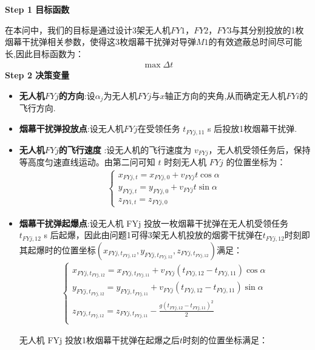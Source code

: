 \documentclass[../main.tex]{subfiles}
\begin{document}
\noindent \textbf{Step 1 目标函数}
\par 在本问中，我们的目标是通过设计3架无人机$FY1$，$FY2$，$FY3$与其分别投放的1枚烟幕干扰弹相关参数，使得这3枚烟幕干扰弹对导弹$M1$的有效遮蔽总时间尽可能长,因此目标函数为：
\begin{align}\label{19.1}
  \max \Delta t
\end{align}
\noindent \textbf{Step 2 决策变量}

\begin{itemize}
\item \textbf{无人机$FYj$的方向}:设$\alpha_j$为无人机$FYj$与$x$轴正方向的夹角,从而确定无人机$FYi$的飞行方向.
\item \textbf{烟幕干扰弹投放点}:设无人机$FYj$在受领任务 \( t_{FYj,11} \) s 后投放1枚烟幕干扰弹.
\item  \textbf{无人机$FYj$的飞行速度} :设无人机的飞行速度为 \( v_{FYj} \)，无人机受领任务后，保持等高度匀速直线运动。由第二问可知 \( t \) 时刻无人机 \( FYj \) 的位置坐标为：
\begin{align}\label{19.3}
  \begin{cases}
x_{FYj,t} = x_{FYj,0} + v_{FYj} t \cos\alpha \\
y_{FYj,t} = y_{FYj,0} + v_{FYj} t \sin\alpha \\
z_{FYi,t} = z_{FYj,0}
\end{cases}
\end{align}
\item \textbf{烟幕干扰弹起爆点}:设无人机 FYj 投放一枚烟幕干扰弹在无人机受领任务 \( t_{FYj,12} \) s 后起爆，因此由问题1可得3架无人机投放的烟雾干扰弹在$t_{FYj,12}$时刻即其起爆时的位置坐标$\left( x_{FYj,t_{FYj,12}},y_{FYj,t_{FYj,12}},z_{FYj,t_{FYj,12}} \right)$满足：
\begin{align}\label{19.4}
\left\{ \begin{array}{l}
	x_{FYj,t_{FYj,12}}=x_{FYj,t_{FYj,11}}+v_{FYj}\left( t_{FYj,12}-t_{FYj,11} \right) \cos \alpha\\
	y_{FYj,t_{FYj,12}}=y_{FYj,t_{FYj,11}}+v_{FYj}\left( t_{FYj,12}-t_{FYj,11} \right) \sin \alpha\\
	z_{FYj,t_{FYj,12}}=z_{FYj,t_{FYj,11}}-\frac{g\left( t_{FYj,12}-t_{FYj,11} \right) ^2}{2}\\
\end{array} \right. 
\end{align}
\par 无人机 FYj 投放1枚烟幕干扰弹在起爆之后$t$时刻的位置坐标满足：
\begin{align}\label{11.9}

\end{align}
\end{itemize}
\end{document}
